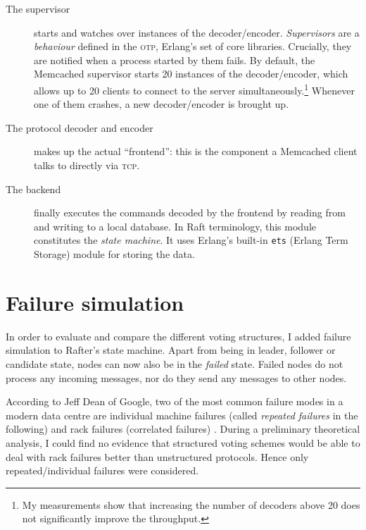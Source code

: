 \documentclass[12pt,chapterprefix=true,toc=bibliography,numbers=noendperiod,
               footnotes=multiple,twoside]{scrreprt}
\newcommand{\ECC}[0]{\textsc{ec}2 }
\begin{document}
\begin{description}
    \item[The supervisor] starts and watches over instances of the decoder/encoder. \emph{Supervisors} are a \emph{behaviour} defined in the \textsc{otp}, Erlang's set of core libraries. Crucially, they are notified when a process started by them fails. By default, the Memcached supervisor starts 20 instances of the decoder/encoder, which allows up to 20 clients to connect to the server simultaneously.\footnote{My measurements show that increasing the number of decoders above 20 does not significantly improve the throughput.} Whenever one of them crashes, a new decoder/encoder is brought up.
    \item[The protocol decoder and encoder] makes up the actual \enquote{frontend}: this is the component a Memcached client talks to directly via \textsc{tcp}.
    \item[The backend] finally executes the commands decoded by the frontend by reading from and writing to a local database. In Raft terminology, this module constitutes the \emph{state machine}. It uses Erlang's built-in \texttt{ets} (Erlang Term Storage) module for storing the data.
\end{description}

\section{Failure simulation}

In order to evaluate and compare the different voting structures, I added failure simulation to Rafter's state machine. Apart from being in leader, follower or candidate state, nodes can now also be in the \textit{failed} state. Failed nodes do not process any incoming messages, nor do they send any messages to other nodes.

According to Jeff Dean of Google, two of the most common failure modes in a modern data centre are individual machine failures (called \emph{repeated failures} in the following) and rack failures (correlated failures) \autocite[sl. 10]{distr}. During a preliminary theoretical analysis, I could find no evidence that structured voting schemes would be able to deal with rack failures better than unstructured protocols. Hence only repeated/individual failures were considered.

\end{document}
